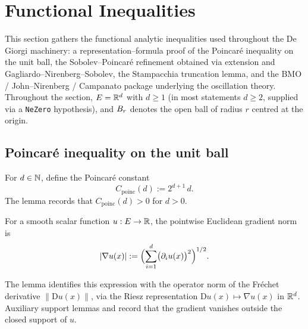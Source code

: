 \chapter{Functional Inequalities}\label{sec:functional}


This section gathers the functional analytic inequalities used throughout the De Giorgi
machinery: a representation--formula proof of the Poincar\'e inequality on the unit ball,
the Sobolev--Poincar\'e refinement obtained via extension and Gagliardo--Nirenberg--Sobolev,
the Stampacchia truncation lemma, and the BMO / John--Nirenberg / Campanato package
underlying the oscillation theory. Throughout the section, $E = \mathbb{R}^d$ with $d \ge 1$
(in most statements $d \ge 2$, supplied via a \texttt{NeZero} hypothesis), and $B_{r}$
denotes the open ball of radius $r$ centred at the origin.

\section{Poincar\'e inequality on the unit ball}

\begin{definition}
\label{def:C_poinc_val}
\leanok
For $d \in \mathbb{N}$, define the Poincar\'e constant
\begin{equation*}
C_{\mathrm{poinc}}(d) := 2^{d+1}\, d.
\end{equation*}
The lemma  records that $C_{\mathrm{poinc}}(d) > 0$ for
$d > 0$.
\end{definition}

\begin{definition}
\label{def:smoothGradNorm}
\leanok
For a smooth scalar function $u : E \to \mathbb{R}$, the pointwise Euclidean gradient norm is
\begin{equation*}
\lvert \nabla u (x)\rvert
:= \Bigl(\sum_{i=1}^d \bigl(\partial_i u(x)\bigr)^{2}\Bigr)^{1/2}.
\end{equation*}
\end{definition}

The lemma  identifies this expression with the
operator norm of the Fr\'echet derivative $\lVert \mathrm{D}u(x)\rVert$, via the
Riesz representation $\mathrm{D}u(x)\mapsto \nabla u (x)$ in
$\mathbb{R}^d$. Auxiliary support lemmas
 and
 record that the gradient vanishes
outside the closed support of $u$.

